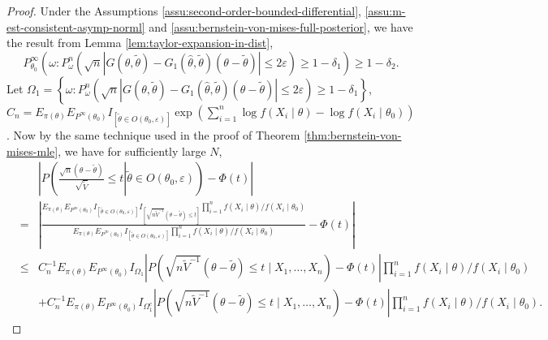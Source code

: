 \begin{proof}
Under the Assumptions \ref{assu:second-order-bounded-differential},
\ref{assu:m-est-consistent-asymp-norml} and \ref{assu:bernstein-von-mises-full-posterior},
we have the result from Lemma \ref{lem:taylor-expansion-in-dist},
\begin{equation}
P_{\theta_{0}}^{\infty}\left(\omega:P_{\omega}^{n}\left(\sqrt{n}\left|G\left(\theta,\tilde{\theta}\right)-G_{1}\left(\hat{\theta},\tilde{\theta}\right)\left(\theta-\tilde{\theta}\right)\right|\le2\varepsilon\right)\ge1-\delta_{1}\right)\ge1-\delta_{2}.\label{eq:conv-in-dist-reminder}
\end{equation}
Let $\Omega_{1}=\left\{ \omega:P_{\omega}^{n}\left(\sqrt{n}\left|G\left(\theta,\tilde{\theta}\right)-G_{1}\left(\hat{\theta},\tilde{\theta}\right)\left(\theta-\tilde{\theta}\right)\right|\le2\varepsilon\right)\ge1-\delta_{1}\right\} $,
$C_{n}=E_{\pi\left(\theta\right)}E_{P^{\infty}\left(\theta_{0}\right)}I_{\left[\tilde{\theta}\in O\left(\theta_{0},\varepsilon\right)\right]}\exp\left(\sum_{i=1}^{n}\log f\left(X_{i}\mid\theta\right)-\log f\left(X_{i}\mid\theta_{0}\right)\right)$.
Now by the same technique used in the proof of Theorem \ref{thm:bernstein-von-mises-mle},
we have for sufficiently large $N$, 
\begin{eqnarray*}
 &  & \left|P\left(\left.\frac{\sqrt{n}\left(\theta-\tilde{\theta}\right)}{\sqrt{\tilde{V}}}\le t\right|\tilde{\theta}\in O\left(\theta_{0},\varepsilon\right)\right)-\Phi\left(t\right)\right|\\
 & = & \left|\frac{E_{\pi\left(\theta\right)}E_{P^{\infty}\left(\theta_{0}\right)}I_{\left[\tilde{\theta}\in O\left(\theta_{0},\varepsilon\right)\right]}I_{\left[\sqrt{n\tilde{V}^{-1}}\left(\theta-\tilde{\theta}\right)\le t\right]}\prod_{i=1}^{n}f\left(X_{i}\mid\theta\right)/f\left(X_{i}\mid\theta_{0}\right)}{E_{\pi\left(\theta\right)}E_{P^{\infty}\left(\theta_{0}\right)}I_{\left[\tilde{\theta}\in O\left(\theta_{0},\varepsilon\right)\right]}\prod_{i=1}^{n}f\left(X_{i}\mid\theta\right)/f\left(X_{i}\mid\theta_{0}\right)}-\Phi\left(t\right)\right|\\
 & \le & C_{n}^{-1}E_{\pi\left(\theta\right)}E_{P^{\infty}\left(\theta_{0}\right)}I_{\Omega_{1}}\left|P\left(\sqrt{n\tilde{V}^{-1}}\left(\theta-\tilde{\theta}\right)\le t\mid X_{1},\ldots,X_{n}\right)-\Phi\left(t\right)\right|\prod_{i=1}^{n}f\left(X_{i}\mid\theta\right)/f\left(X_{i}\mid\theta_{0}\right)\\
 &  & +C_{n}^{-1}E_{\pi\left(\theta\right)}E_{P^{\infty}\left(\theta_{0}\right)}I_{\Omega_{1}^{c}}\left|P\left(\sqrt{n\tilde{V}^{-1}}\left(\theta-\tilde{\theta}\right)\le t\mid X_{1},\ldots,X_{n}\right)-\Phi\left(t\right)\right|\prod_{i=1}^{n}f\left(X_{i}\mid\theta\right)/f\left(X_{i}\mid\theta_{0}\right).
\end{eqnarray*}



\end{proof}
